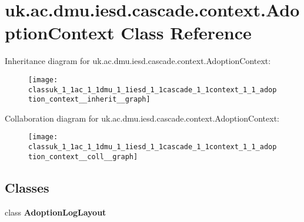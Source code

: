 \hypertarget{classuk_1_1ac_1_1dmu_1_1iesd_1_1cascade_1_1context_1_1_adoption_context}{\section{uk.\-ac.\-dmu.\-iesd.\-cascade.\-context.\-Adoption\-Context Class Reference}
\label{classuk_1_1ac_1_1dmu_1_1iesd_1_1cascade_1_1context_1_1_adoption_context}
}


Inheritance diagram for uk.\-ac.\-dmu.\-iesd.\-cascade.\-context.\-Adoption\-Context\-:\nopagebreak
\begin{figure}[H]
\begin{center}
\leavevmode
\texttt{[image: classuk\_1\_1ac\_1\_1dmu\_1\_1iesd\_1\_1cascade\_1\_1context\_1\_1\_adoption\_context\_\_inherit\_\_graph]}
\end{center}
\end{figure}


Collaboration diagram for uk.\-ac.\-dmu.\-iesd.\-cascade.\-context.\-Adoption\-Context\-:\nopagebreak
\begin{figure}[H]
\begin{center}
\leavevmode
\texttt{[image: classuk\_1\_1ac\_1\_1dmu\_1\_1iesd\_1\_1cascade\_1\_1context\_1\_1\_adoption\_context\_\_coll\_\_graph]}
\end{center}
\end{figure}
\subsection*{Classes}
\begin{DoxyCompactItemize}
\item 
class {\bfseries Adoption\-Log\-Layout}
\end{DoxyCompactItemize}
